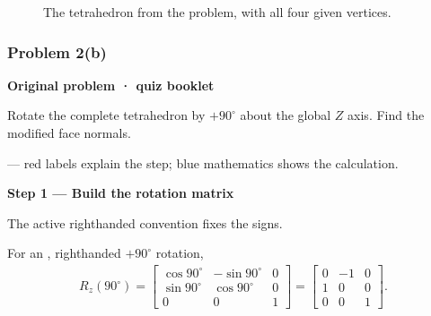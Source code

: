 \documentclass[letterpaper,11pt,english,openany,oneside]{jupyterBook}
\begin{document}
\par

\begin{figure}[H]
\centering
\capstart

\noindent{}
\caption{The tetrahedron from the problem, with all four given vertices.}\label{\detokenize{lectures/lecture01/quiz-workbook:id3}}\end{figure}


\subsubsection{Problem 2(b)}
\label{\detokenize{lectures/lecture01/quiz-workbook:problem-2-b}}\label{\detokenize{lectures/lecture01/quiz-workbook:quiz-18-q3}}\label{\detokenize{lectures/lecture01/quiz-workbook:ex-lec01-rotated-normals}}
\par\medskip\textbf{Original problem · quiz booklet}\par\smallskip

\sphinxAtStartPar
Rotate the complete tetrahedron by \(+90^\circ\) about the global \(Z\) axis. Find the modified face normals.

\par\medskip

\sphinxAtStartPar
{} — red labels explain the step; blue mathematics shows the calculation.

\par\medskip{}
{\color{QuizStepRed}\bfseries Step 1 — Build the rotation matrix}\par\smallskip

\sphinxAtStartPar
{} The active right\sphinxhyphen{}handed convention fixes the signs.

\sphinxAtStartPar
For an , right\sphinxhyphen{}handed {\color{QuizMathBlue} \(+90^\circ\)} rotation,
{\color{QuizMathBlue} \begin{equation*}
\begin{split}
R_z(90^\circ)=\begin{bmatrix}\cos90^\circ&-\sin90^\circ&0\\\sin90^\circ&\cos90^\circ&0\\0&0&1\end{bmatrix}=\begin{bmatrix}0&-1&0\\1&0&0\\0&0&1\end{bmatrix}.
\end{split}
\end{equation*}}
\par
\end{document}
